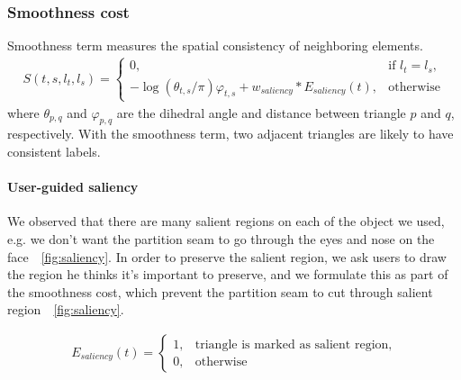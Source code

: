 \subsubsection{Smoothness cost}
Smoothness term measures the spatial consistency of neighboring elements.
\begin{align}
S(t, s, l_t, l_s) = 
\begin{cases}
0, & \text{if } l_t = l_s, \\
-\log(\theta_{t,s}/\pi)\varphi_{t,s} + w_{saliency} * E_{saliency}(t), & \text{otherwise} 
\end{cases}
\end{align}
where $\theta_{p,q}$ and $\varphi_{p,q}$ are the dihedral angle and distance between triangle $p$ and $q$, respectively.
With the smoothness term, two adjacent triangles are likely to have consistent labels.

\paragraph{User-guided saliency} 
We observed that there are many salient regions on each of the object we used, e.g. we don't want the partition seam to go through the eyes and nose on the face~\figname~\ref{fig:saliency}.
In order to preserve the salient region, we ask users to draw the region he thinks it's important to preserve, and we formulate this as part of the smoothness cost, which prevent the partition seam to cut through salient region~\figname~\ref{fig:saliency}.

\begin{align}
E_{saliency}(t) = 
\begin{cases}
1, & \text{triangle is marked as salient region}, \\
0, & \text{otherwise} 
\end{cases}
\end{align}

